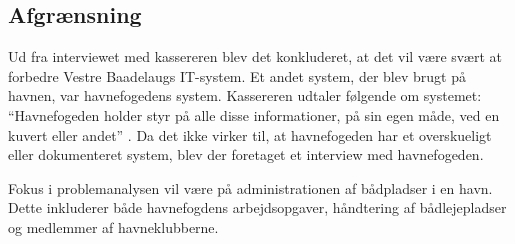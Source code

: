 \subsection{Afgrænsning} %

Ud fra interviewet med kassereren blev det konkluderet, at det vil være svært at forbedre Vestre Baadelaugs IT-system. Et andet system, der blev brugt på havnen, var havnefogedens system. Kassereren udtaler følgende om systemet: \enquote{Havnefogeden holder styr på alle disse informationer, på sin egen måde, ved en kuvert eller andet} \cite{int_vb_sl}. Da det ikke virker til, at havnefogeden har et overskueligt eller dokumenteret system, blev der foretaget et interview med havnefogeden.

Fokus i problemanalysen vil være på administrationen af bådpladser i en havn. Dette inkluderer både havnefogdens arbejdsopgaver, håndtering af bådlejepladser og medlemmer af havneklubberne.
